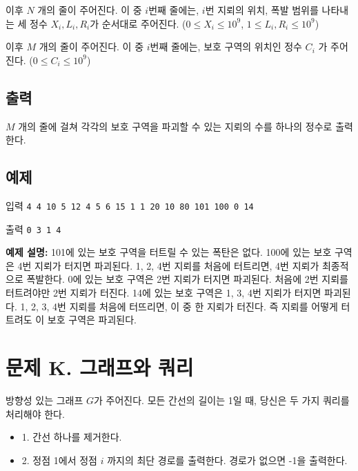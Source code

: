 \documentclass{article}
\begin{document}
이후 $N$ 개의 줄이 주어진다. 이 중 $i$번째 줄에는, $i$번 지뢰의 위치, 폭발 범위를 나타내는 세 정수 $X_i, L_i, R_i$가 순서대로 주어진다. ($0 \leq X_i \leq 10^9$, $1 \leq L_i, R_i \leq 10^9$) \newline

이후 $M$ 개의 줄이 주어진다. 이 중 $i$번째 줄에는, 보호 구역의 위치인 정수 $C_i$ 가 주어진다. ($0 \leq C_i \leq 10^9$)

\subsection{출력}
$M$ 개의 줄에 걸쳐 각각의 보호 구역을 파괴할 수 있는 지뢰의 수를 하나의 정수로 출력한다. 

\subsection{예제}
입력
\bgroup\obeylines
\texttt{4 4
	10 5 12
	4 5 6
	15 1 1
	20 10 80
	101
	100
	0
	14\newline}
\egroup

출력
\bgroup\obeylines
\texttt{0
	3
	1
	4\newline}
\egroup


\textbf{예제 설명:} 101에 있는 보호 구역을 터트릴 수 있는 폭탄은 없다. \newline
100에 있는 보호 구역은 4번 지뢰가 터지면 파괴된다. 1, 2, 4번 지뢰를 처음에 터트리면, 4번 지뢰가 최종적으로 폭발한다. \newline
0에 있는 보호 구역은 2번 지뢰가 터지면 파괴된다. 처음에 2번 지뢰를 터트려야만 2번 지뢰가 터진다. \newline
14에 있는 보호 구역은 1, 3, 4번 지뢰가 터지면 파괴된다. 1, 2, 3, 4번 지뢰를 처음에 터뜨리면, 이 중 한 지뢰가 터진다. 즉 지뢰를 어떻게 터트려도 이 보호 구역은 파괴된다.

\newpage

\section{문제 K.  그래프와 쿼리}
방향성 있는 그래프 $G$가 주어진다. 모든 간선의 길이는 1일 때, 당신은 두 가지 쿼리를 처리해야 한다.

\begin{itemize}
	\item 1. 간선 하나를 제거한다.
	\item 2. 정점 1에서 정점 $i$ 까지의 최단 경로를 출력한다. 경로가 없으면 -1을 출력한다.
\end{itemize}
\end{document}
